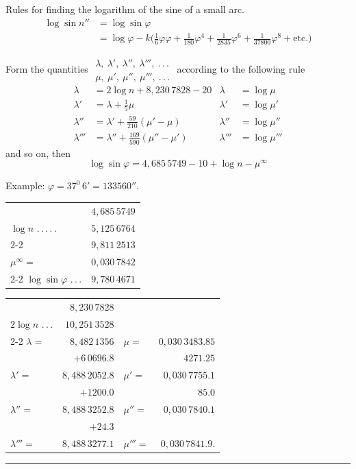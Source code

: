 Rules for finding the logarithm of the sine of a small arc.
\[
\begin{aligned}
\log\sin n''&=\log\sin\varphi\\
&=\log\varphi-k\bigl(\tfrac16\varphi\varphi+\tfrac1{180}\varphi^4+\tfrac1{2835}\varphi^6+\tfrac1{37800}\varphi^8+\text{etc.}\bigr)
\end{aligned}
\]

Form the quantities \(\begin{smallmatrix}\lambda,\ \lambda',\ \lambda'',\ \lambda''',\ .\,.\,.\\\mu,\ \mu',\ \mu'',\ \mu''',\ .\,.\,.\end{smallmatrix}\) according to the following rule
\[
\begin{aligned}
\lambda&=2\log n+8{,}230\,7828-20&\lambda&=\log\mu\\
\lambda'&=\lambda+\tfrac15\mu&\lambda'&=\log\mu'\\
\lambda''&=\lambda'+\tfrac{59}{210}(\mu'-\mu)&\lambda''&=\log\mu''\\
\lambda'''&=\lambda''+\tfrac{169}{590}(\mu''-\mu')&\lambda'''&=\log\mu'''
\end{aligned}
\]
\noindent and so on,
then
\[
\log\sin\varphi=4{,}685\,5749-10+\log n-\mu^{\infty}
\]

Example: \(\varphi=37^0\,6'=133560''\).
\begin{center}
\begin{tabular}{@{}lr@{}}
&\(4{,}685\,5749\)\\
\(\log n\) .\,.\,.\,.\,.&\(5{,}125\,6764\)\\
\cline{2-2}
&\(9{,}811\,2513\)\\
\(\mu^{\infty}=\)&\(0{,}030\,7842\)\\
\cline{2-2}
\(\log\sin\varphi\) .\,.\,.&\(9{,}780\,4671\)
\end{tabular}
\end{center}
\begin{center}
\begin{tabular}{@{}lr@{\qquad}lr@{}}
&\(8{,}230\,7828\)&&\\
\(2\log n\) .\,.\,.&\(10{,}251\,3528\)&&\\
\cline{2-2}
\(\lambda=\)&\(8{,}482\,1356\)&\(\mu=\)&\(0{,}030\,3483.85\)\\
&\(+6\,0696.8\)&&\(4271.25\)\\
\(\lambda'=\)&\(8{,}488\,2052.8\)&\(\mu'=\)&\(0{,}030\,7755.1\)\\
&\(+1200.0\)&&\(85.0\)\\
\(\lambda''=\)&\(8{,}488\,3252.8\)&\(\mu''=\)&\(0{,}030\,7840.1\)\\
&\(+24.3\)&&\\
\(\lambda'''=\)&\(8{,}488\,3277.1\)&\(\mu'''=\)&\(0{,}030\,7841.9\).
\end{tabular}
\end{center}
\begin{center}\rule{.18\textwidth}{.35pt}\end{center}
